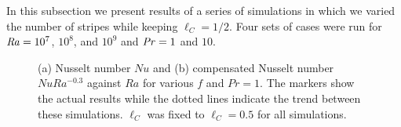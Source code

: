 \documentclass{jfm}
\newcommand\Pran{\mbox{\textit{Pr}}} %
\newcommand\Ray{\mbox{\textit{Ra}}}  %
\begin{document}
In this subsection we present results of a series of simulations in which we
varied the number of stripes while keeping $\ell_C = 1/2$. Four sets of cases
were run for $\Ray = 10^7$, $10^8$, and $10^9$ and $\Pran = 1$ and $10$.

%
%
\begin{figure}
\centering
{}
\caption{%
(a) Nusselt number $Nu$  and (b)
compensated Nusselt number $NuRa^{-0.3}$  against $Ra$ for various $f$ and
$Pr=1$. The markers show the actual results while the dotted lines
indicate the trend between these simulations. $\ell_C$ was fixed to
$\ell_C=0.5$ for all simulations.}
\label{figure:raVSnusboth}%
\end{figure}%
\end{document}

